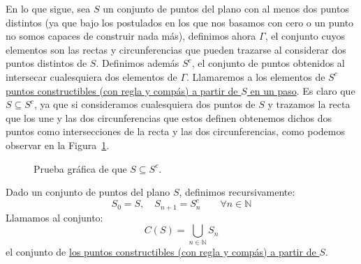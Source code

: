 \noindent
En lo que sigue, sea $S$ un conjunto de puntos del plano con al menos dos puntos distintos (ya que bajo los postulados en los que nos basamos con cero o un punto no somos capaces de construir nada más), definimos ahora $\Gamma$, el conjunto cuyos elementos son las rectas y circunferencias que pueden trazarse al considerar dos puntos distintos de $S$. Definimos además $S^c$, el conjunto de puntos obtenidos al intersecar cualesquiera dos elementos de $\Gamma$. Llamaremos a los elementos de $S^c$ \underline{puntos constructibles (con regla y compás) a partir de $S$ en un paso}. Es claro que $S\subseteq S^c$, ya que si consideramos cualesquiera dos puntos de $S$ y trazamos la recta que los une y las dos circunferencias que estos definen obtenemos dichos dos puntos como intersecciones de la recta y las dos circunferencias, como podemos observar en la Figura~\ref{fig:prueba_grafica}.

\begin{figure}
    \centering
        \caption{Prueba gráfica de que $S\subseteq S^c$.}
        \label{fig:prueba_grafica}
\end{figure}

\begin{definicion}
    Dado un conjunto de puntos del plano $S$, definimos recursivamente:
    \begin{equation*}
        S_0 = S, \quad S_{n+1} = S_n^c \qquad \forall n\in \mathbb{N}
    \end{equation*}
    Llamamos al conjunto:
    \begin{equation*}
        C(S) = \bigcup_{n\in \mathbb{N}}S_n
    \end{equation*}
    el conjunto de \underline{los puntos constructibles (con regla y compás) a partir de $S$}.
\end{definicion}

